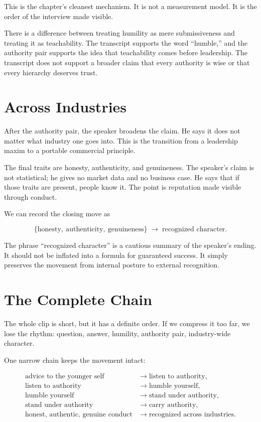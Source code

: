 This is the chapter's cleanest mechanism. It is not a measurement model. It is the order of the interview made visible.

\begin{remark}
There is a difference between treating humility as mere submissiveness and treating it as teachability. The transcript supports the word ``humble,'' and the authority pair supports the idea that teachability comes before leadership. The transcript does not support a broader claim that every authority is wise or that every hierarchy deserves trust.
\end{remark}

\section{Across Industries}

After the authority pair, the speaker broadens the claim. He says it does not matter what industry one goes into. This is the transition from a leadership maxim to a portable commercial principle.

The final traits are honesty, authenticity, and genuineness. The speaker's claim is not statistical; he gives no market data and no business case. He says that if those traits are present, people know it. The point is reputation made visible through conduct.

We can record the closing move as

\begin{equation}
\{\text{honesty},\ \text{authenticity},\ \text{genuineness}\}
\;\longrightarrow\;
\text{recognized character}.
\end{equation}

The phrase ``recognized character'' is a cautious summary of the speaker's ending. It should not be inflated into a formula for guaranteed success. It simply preserves the movement from internal posture to external recognition.

\section{The Complete Chain}

The whole clip is short, but it has a definite order. If we compress it too far, we lose the rhythm: question, answer, humility, authority pair, industry-wide character.

One narrow chain keeps the movement intact:

\begin{align}
\text{advice to the younger self}
&\longrightarrow
\text{listen to authority},\\
\text{listen to authority}
&\longrightarrow
\text{humble yourself},\\
\text{humble yourself}
&\longrightarrow
\text{stand under authority},\\
\text{stand under authority}
&\longrightarrow
\text{carry authority},\\
\text{honest, authentic, genuine conduct}
&\longrightarrow
\text{recognized across industries}.
\end{align}

